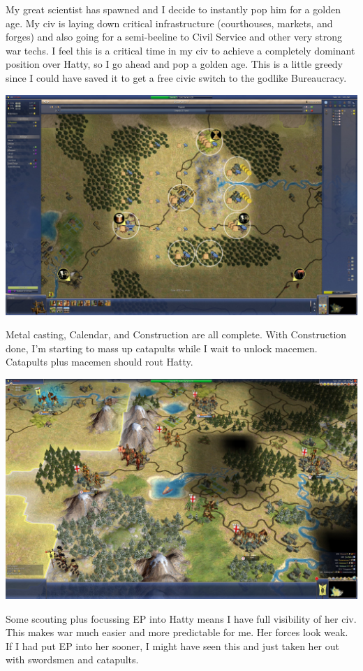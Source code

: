 \documentclass[10pt]{article}
\begin{document}
My great scientist has spawned and I decide to instantly pop him for a golden age. My civ is laying down critical
infrastructure (courthouses, markets, and forges) and also going for a semi-beeline to Civil Service and other very
strong war techs. I feel this is a critical time in my civ to achieve a completely dominant position over Hatty, so
I go ahead and pop a golden age. This is a little greedy since I could have saved it to get a free civic switch to
the godlike Bureaucracy.

\includegraphics[width=1.0\textwidth]{120}

Metal casting, Calendar, and Construction are all complete. With Construction done, I'm starting to mass up catapults
while I wait to unlock macemen. Catapults plus macemen should rout Hatty.

\includegraphics[width=1.0\textwidth]{121}

Some scouting plus focussing EP into Hatty means I have full visibility of her civ. This makes war much easier
and more predictable for me. Her forces look weak. If I had put EP into her sooner, I might have seen this and just
taken her out with swordsmen and catapults.
\end{document}
